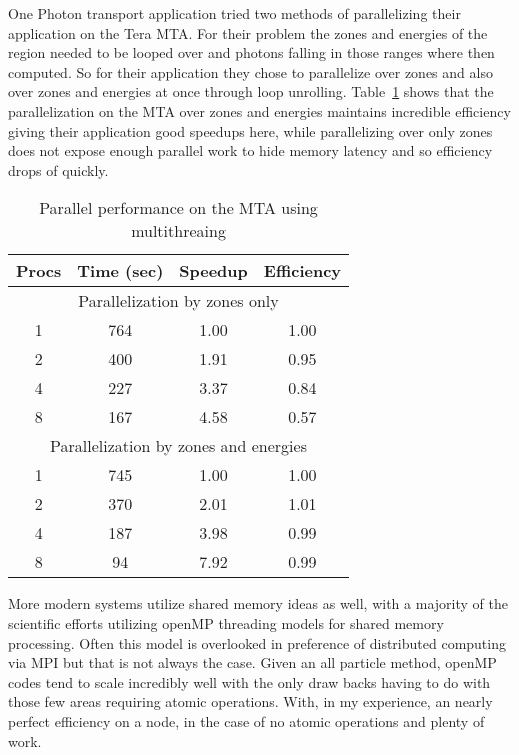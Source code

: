 %
One Photon transport application tried two methods of parallelizing their application on the Tera MTA. 
%
For their problem the zones and energies of the region needed to be looped over and photons falling in those ranges where then computed.
%
So for their application they chose to parallelize over zones and also over zones and energies at once through loop unrolling.
%
Table~\ref{tab:MTAPerf} shows that the parallelization on the MTA over zones and energies maintains incredible efficiency giving their application good speedups here, while parallelizing over only zones does not expose enough parallel work to hide memory latency and so efficiency drops of quickly.
%
\begin{table}
\caption {Parallel performance on the MTA using multithreaing} \label{tab:MTAPerf} 
\begin{center}
\begin{tabular}{|c|c|c|c|}
\hline
Procs & Time (sec) & Speedup & Efficiency \\
\hline
\multicolumn{4}{|c|}{Parallelization by zones only} \\
\hline
1 & 764 & 1.00 & 1.00 \\
\hline
2 & 400 & 1.91 & 0.95 \\
\hline
4 & 227 & 3.37 & 0.84 \\
\hline
8 & 167 & 4.58 & 0.57 \\
\hline
\multicolumn{4}{|c|}{Parallelization by zones and energies} \\
\hline
1 & 745 & 1.00 & 1.00 \\
\hline
2 & 370 & 2.01 & 1.01 \\
\hline
4 & 187 & 3.98 & 0.99 \\
\hline
8 & 94 & 7.92 & 0.99 \\
\hline
\end{tabular}
\end{center}
\end{table}

More modern systems utilize shared memory ideas as well, with a majority of the scientific efforts utilizing openMP threading models for shared memory processing.
%
Often this model is overlooked in preference of distributed computing via MPI but that is not always the case.
%
Given an all particle method, openMP codes tend to scale incredibly well with the only draw backs having to do with those few areas requiring atomic operations.
%
With, in my experience, an nearly perfect efficiency on a node, in the case of no atomic operations and plenty of work.


